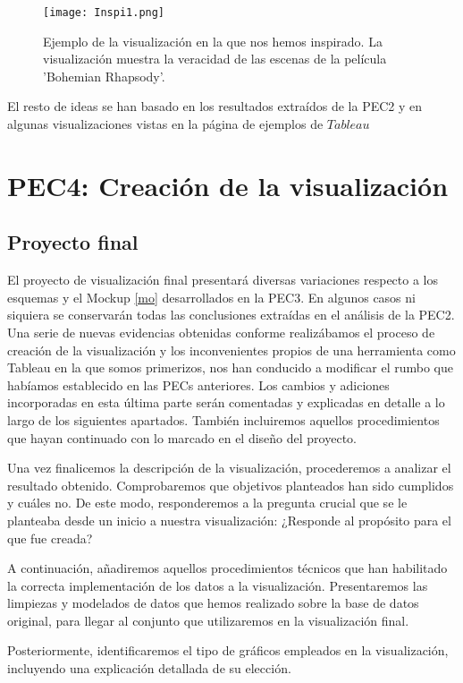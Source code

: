\documentclass[11pt]{article}
\begin{document}
\begin{figure}[h]
\texttt{[image: Inspi1.png]}
\caption{Ejemplo de la visualización en la que nos hemos inspirado. La visualización muestra la veracidad de las escenas de la película 'Bohemian Rhapsody'.}
\end{figure}

El resto de ideas se han basado en los resultados extraídos de la PEC2 y en algunas visualizaciones vistas en la página de ejemplos de $\textit{Tableau}$ \cite{tab}

\section{PEC4: Creación de la visualización}

\subsection{Proyecto final}

El proyecto de visualización final presentará diversas variaciones respecto a los esquemas y el Mockup \ref{mo}
desarrollados en la PEC3. En algunos casos ni siquiera se conservarán todas las conclusiones extraídas en el análisis de la PEC2. Una serie de nuevas evidencias obtenidas conforme realizábamos el proceso de creación de la visualización y los inconvenientes propios de una herramienta como Tableau en la que somos primerizos, nos han conducido a modificar el rumbo que habíamos establecido en las PECs anteriores. Los cambios y adiciones incorporadas en esta última parte serán comentadas y explicadas en detalle a lo largo de los siguientes apartados. También incluiremos aquellos procedimientos que hayan continuado con lo marcado en el diseño del proyecto.

Una vez finalicemos la descripción de la visualización, procederemos a analizar el resultado obtenido. Comprobaremos que objetivos planteados han sido cumplidos y cuáles no. De este modo, responderemos a la pregunta crucial que se le planteaba desde un inicio a nuestra visualización: ¿Responde al propósito para el que fue creada?

A continuación, añadiremos aquellos procedimientos técnicos que han habilitado la correcta implementación de los datos a la visualización. Presentaremos las limpiezas y modelados de datos que hemos realizado sobre la base de datos original, para llegar al conjunto que utilizaremos en la visualización final.

Posteriormente, identificaremos el tipo de gráficos empleados en la visualización, incluyendo una explicación detallada de su elección.
\end{document}
